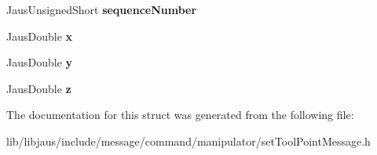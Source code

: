 \begin{DoxyCompactItemize}
\item 
\hypertarget{struct_set_tool_point_message_struct_a45ffab4357649c7f4627cbedea936865}{\-Jaus\-Unsigned\-Short {\bfseries sequence\-Number}}\label{struct_set_tool_point_message_struct_a45ffab4357649c7f4627cbedea936865}

\item 
\hypertarget{struct_set_tool_point_message_struct_a03ba4582dfabf5267f5ab3b082cabda8}{\-Jaus\-Double {\bfseries x}}\label{struct_set_tool_point_message_struct_a03ba4582dfabf5267f5ab3b082cabda8}

\item 
\hypertarget{struct_set_tool_point_message_struct_a096cf4b325a3770ecd833455f4252ce0}{\-Jaus\-Double {\bfseries y}}\label{struct_set_tool_point_message_struct_a096cf4b325a3770ecd833455f4252ce0}

\item 
\hypertarget{struct_set_tool_point_message_struct_a20fe8b639a2f04ee7cb460a81c0beef8}{\-Jaus\-Double {\bfseries z}}\label{struct_set_tool_point_message_struct_a20fe8b639a2f04ee7cb460a81c0beef8}

\end{DoxyCompactItemize}


\-The documentation for this struct was generated from the following file\-:\begin{DoxyCompactItemize}
\item 
lib/libjaus/include/message/command/manipulator/set\-Tool\-Point\-Message.\-h\end{DoxyCompactItemize}
